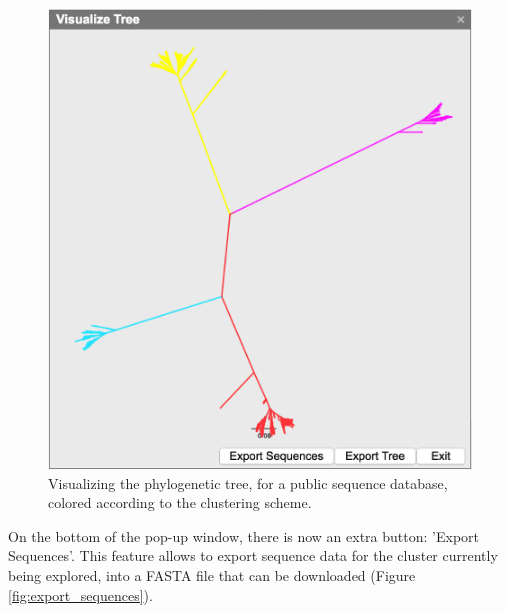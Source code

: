 \documentclass[a4paper, 11pt]{article} %
\begin{document}
\begin{figure}[H]
\centering
\includegraphics[scale=0.250]{images/publicdatabase.PNG}
\vspace{-0.25cm}
\caption{Visualizing the phylogenetic tree, for a public sequence database, colored according to the clustering scheme.}
\label{fig:view_tree_public}
\end{figure}


On the bottom of the pop-up window, there is now an extra button: 'Export Sequences'.
This feature allows to export sequence data for the cluster currently being explored, into a FASTA file that can be downloaded (Figure \ref{fig:export_sequences}).
\end{document}
